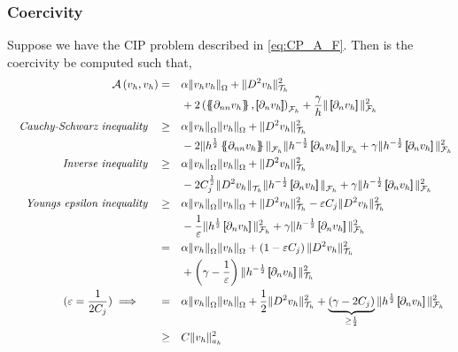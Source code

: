 \subsubsection{Coercivity}%
\label{ssub:coercitivity}


Suppose we have the CIP problem described in \eqref{eq:CP_A_F}. Then is the coercivity be computed such that,
\[
    \begin{split}
\mathcal{A} \left( v_{h}, v_{h} \right)  =& \quad  \alpha \|  v_{h}  v_{h} \|_{ \Omega  }^{  } +  \| D^2v_{h} \|_{ \mathcal{T} _{h} }^{2  }   \\
& \quad + 2 \left(  \mean{ \partial _{nn} v_{h} }    ,  \jump{ \partial _{n}v_{h} }     \right) _{\mathcal{F} _{h}} +  \frac{\gamma}{h} \|  \jump{ \partial _{n} v_{h} }
  \|_{ \mathcal{F} _{h} }^{ 2 } \\
\quad \textit{Cauchy-Schwarz inequality} \quad
 \ge& \quad  \alpha \| v_{h}  \|_{\Omega   }^{  } \| v_{h} \|_{\Omega   }^{  } +   \| D ^2 v_{h} \|_{ \mathcal{T} _{h} }^{2  } \\
& \quad -2 \| h^{\frac{1}{2}} \mean{ \partial _{nn}v_{h} }    \|_{  \mathcal{F} _{h}}^{  } \| h^{-\frac{1}{2}} \jump{ \partial _{n}v_{h} }    \|_{  \mathcal{F} _{h}}^{  } + \gamma \| h^{-\frac{1}{2}}  \jump{ \partial _{n}v_{h} }   \|_{ \mathcal{F} _{h}  }^{ 2 } \\
\quad \textit{Inverse inequality} \quad
   \ge & \quad  \alpha \| v_{h}  \|_{\Omega   }^{  } \| v_{h} \|_{\Omega   }^{  } + \| D ^2 v_{h}  \|_{ \mathcal{T} _{h}  }^{ 2  }  \\
 &  \quad - 2 C^{\frac{1}{2}}_{j} \|   D ^2 v_{h}    \|_{ \mathcal{T} _{h}  }^{  } \| h^{-\frac{1}{2}} \jump{ \partial _{n} v_{h} }   \|_{ \mathcal{F} _{h} }^{  }  + \gamma \| h^{ -\frac{1}{2}} \jump{
 \partial _{n } v_{h}}   \|_{ \mathcal{F}_{h}}^{2}  \\
\quad \textit{ Youngs epsilon inequality} \quad
    \ge  &  \quad  \alpha \| v_{h}  \|_{\Omega   }^{  } \| v_{h} \|_{\Omega   }^{  } +  \| D ^2 v_{h} \|_{ \mathcal{T}_{h}  }^{2  } - \varepsilon C_{j} \| D ^2 v_{h} \|_{ \mathcal{T} _{h} }^{2  } \\
  & \quad  - \frac{1}{\varepsilon } \| h^{\frac{1}{2}} \jump{ \partial _{n} v_{h} }   \|_{ \mathcal{F} _{h} }^{2  }  + \gamma \|
  h^{-\frac{1}{2}} \jump{ \partial _{n} v_{h}}   \|_{ \mathcal{F} _{h} }^{2  }  \\
   =&  \quad  \alpha \| v_{h}  \|_{\Omega   }^{  } \| v_{h} \|_{\Omega   }^{  } +\left( 1 - \varepsilon C_{j} \right) \| D ^2 v_{h} \|_{\mathcal{T} _{h}  }^{ 2 }  \\
  & \quad + \left( \gamma  - \frac{1}{\varepsilon } \right) \| h^{-\frac{1}{2}} \jump{ \partial _{n} v_{h} }   \|_{ \mathcal{T} _{h} }^{ 2 } \\
  (\varepsilon  = \frac{1}{2 C_{j} })  \implies  \quad \quad =& \quad  \alpha \| v_{h}  \|_{\Omega   }^{  } \| v_{h} \|_{\Omega   }^{  } +\frac{1}{2} \| D ^2 v_{h} \|_{ \mathcal{T} _{h} }^{ 2 }  + \underbrace{\left( \gamma -2 C_{j} \right)}_{ \ge  \frac{1}{2}}  \| h^{\frac{1}{2}} \jump{ \partial _{n} v_{h} }   \|_{
  \mathcal{F} _{h} }^{2  } \\
   \ge & \quad  C \| v_{h} \|_{ a_{h} }^{  2}
    \end{split}
\]
